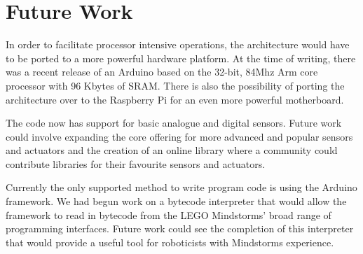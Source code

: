 \section{Future Work}
In order to facilitate processor intensive operations, the architecture would have to be ported to a more powerful hardware platform. At the time of writing, there was a recent release of an Arduino based on the 32-bit, 84Mhz Arm core processor with 96 Kbytes of SRAM. There is also the possibility of porting the architecture over to the Raspberry Pi for an even more powerful motherboard.

The code now has support for basic analogue and digital sensors. Future work could involve expanding the core offering for more advanced and popular sensors and actuators and the creation of an online library where a community could contribute libraries for their favourite sensors and actuators.

Currently the only supported method to write program code is using the Arduino framework. We had begun work on a bytecode interpreter that would allow the \xten framework to read in bytecode from the LEGO Mindstorms' broad range of programming interfaces. Future work could see the completion of this interpreter that would provide a useful tool for roboticists with Mindstorms experience.